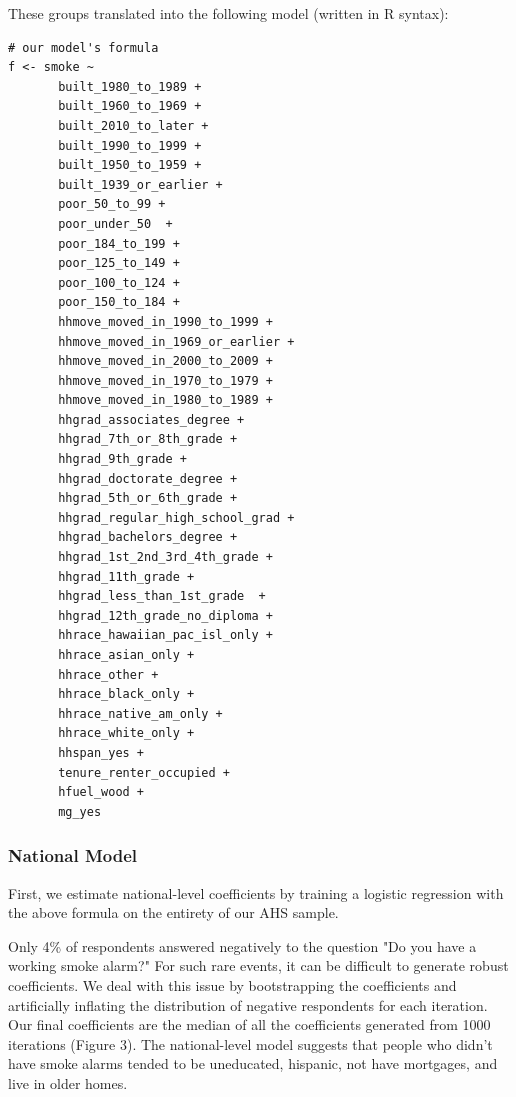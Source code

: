 \documentclass{sig-alternate}
\begin{document}
These groups translated into the following model (written in R syntax):

\begin{verbatim}
# our model's formula
f <- smoke ~  
       built_1980_to_1989 +
       built_1960_to_1969 +
       built_2010_to_later +
       built_1990_to_1999 +
       built_1950_to_1959 +
       built_1939_or_earlier +
       poor_50_to_99 +
       poor_under_50  +
       poor_184_to_199 +
       poor_125_to_149 +
       poor_100_to_124 +
       poor_150_to_184 +
       hhmove_moved_in_1990_to_1999 +
       hhmove_moved_in_1969_or_earlier +
       hhmove_moved_in_2000_to_2009 +
       hhmove_moved_in_1970_to_1979 +
       hhmove_moved_in_1980_to_1989 +
       hhgrad_associates_degree +
       hhgrad_7th_or_8th_grade +
       hhgrad_9th_grade +
       hhgrad_doctorate_degree +
       hhgrad_5th_or_6th_grade +
       hhgrad_regular_high_school_grad +
       hhgrad_bachelors_degree +
       hhgrad_1st_2nd_3rd_4th_grade +
       hhgrad_11th_grade +
       hhgrad_less_than_1st_grade  +
       hhgrad_12th_grade_no_diploma +
       hhrace_hawaiian_pac_isl_only +
       hhrace_asian_only +
       hhrace_other +
       hhrace_black_only +
       hhrace_native_am_only +
       hhrace_white_only +
       hhspan_yes +
       tenure_renter_occupied +
       hfuel_wood +
       mg_yes
\end{verbatim}

\subsubsection{National Model}

First, we estimate national-level coefficients by training a logistic regression with the above formula on the entirety of our AHS sample.

Only 4\% of respondents answered negatively to the question "Do you have a working smoke alarm?" For such rare events, it can be difficult to generate robust coefficients. We deal with this issue by bootstrapping the coefficients and artificially inflating the distribution of negative respondents for each iteration. Our final coefficients are the median of all the coefficients generated from 1000 iterations (Figure 3). The national-level model suggests that people who didn't have smoke alarms tended to be uneducated, hispanic, not have mortgages, and live in older homes.
\end{document}
